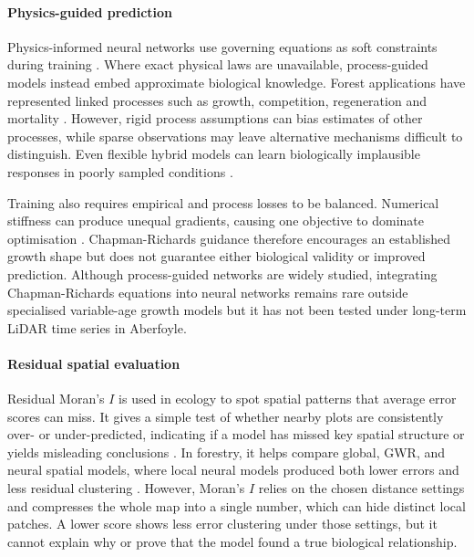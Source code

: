 \documentclass[logo,msc,ai]{infthesis}           %
\begin{document}
\paragraph*{Physics-guided prediction}
Physics-informed neural networks use governing equations as soft constraints during training \cite{raissi2019Physics_C4_NN}. Where exact physical laws are unavailable, process-guided models instead embed approximate biological knowledge. Forest applications have represented linked processes such as growth, competition, regeneration and mortality \cite{pichler2025Inferring_C4_NN}. However, rigid process assumptions can bias estimates of other processes, while sparse observations may leave alternative mechanisms difficult to distinguish. Even flexible hybrid models can learn biologically implausible responses in poorly sampled conditions \cite{pichler2025Inferring_C4_NN}.

Training also requires empirical and process losses to be balanced. Numerical stiffness can produce unequal gradients, causing one objective to dominate optimisation \cite{wang2021Understanding_C4_NN}. Chapman-Richards guidance therefore encourages an established growth shape but does not guarantee either biological validity or improved prediction. Although process-guided networks are widely studied, integrating Chapman-Richards equations into neural networks remains rare outside specialised variable-age growth models but it has not been tested under long-term LiDAR time series in Aberfoyle.

\paragraph*{Residual spatial evaluation}
Residual Moran's $I$ is used in ecology to spot spatial patterns that average error scores can miss. It gives a simple test of whether nearby plots are consistently over- or under-predicted, indicating if a model has missed key spatial structure or yields misleading conclusions \cite{moran1950Notes_c5_eval,kim2021Predicting_C5_EVAL}. In forestry, it helps compare global, GWR, and neural spatial models, where local neural models produced both lower errors and less residual clustering \cite{sun2022Local_C4_NN}. However, Moran's $I$ relies on the chosen distance settings and compresses the whole map into a single number, which can hide distinct local patches. A lower score shows less error clustering under those settings, but it cannot explain why or prove that the model found a true biological relationship.
\end{document}
